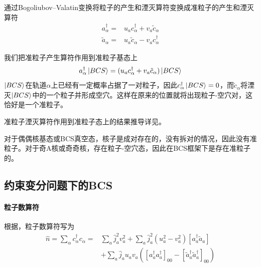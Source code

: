 通过Bogoliubov–Valatin变换\cite{Bogoliubov1958,Valatin1961May}将粒子的产生和湮灭算符变换成准粒子的产生和湮灭算符
\begin{equation}\begin{aligned}
    a^{\dagger}_{\alpha} =& u_{a} c^{\dagger}_{\alpha} + v_{a} \tilde{c}_{\alpha} \\
    \tilde{a}_{\alpha} =& u_{a} \tilde{c}_{\alpha} - v_{a} c^{\dagger}_{\alpha}
    \label{eq:qp-crt-hil}
\end{aligned}\end{equation}

\begin{note}
    我们把准粒子产生算符作用到准粒子基态上
    $$a^{\dagger}_{\alpha} \Ket{BCS} = (u_{a} c^{\dagger}_{\alpha} + v_{a} \tilde{c}_{\alpha}) \Ket{BCS}$$
    $\Ket{BCS}$在轨道$\alpha$上已经有一定概率占据了一对粒子，因此$c^{\dagger}_{\alpha}\Ket{BCS} = 0$，而$\tilde{c}_{\alpha}$将湮灭$\Ket{BCS}$中的一个粒子并形成空穴。这样在原来的位置就将出现粒子-空穴对，这恰好是一个准粒子。

    准粒子湮灭算符作用到准粒子态上的结果推导详见\citep[P. 182 脚注]{zengjy}。
\end{note}

对于偶偶核基态或BCS真空态，核子是成对存在的，没有拆对的情况，因此没有准粒子。对于奇A核或奇奇核，存在粒子-空穴态，因此在BCS框架下是存在准粒子的。


\subsection{约束变分问题下的BCS}

\paragraph*{粒子数算符}

根据\citep[Eq. 13.38]{suhonen-NtoN}，粒子数算符写为
\begin{equation*}\begin{aligned}
    \hat{n} = \sum_{\alpha}c^{\dagger}_{\alpha} c_{\alpha} =& \sum_{a} \hat{j}^2_{a} v_{a}^2 + \sum_{a} \hat{j}^2_{a} (u_{a}^2 - v_{a}^2) \left[a_{a}^{\dagger} \tilde{a}_a\right] \\
                                                            & + \sum_{a} \hat{j}_{a} u_{a} v_{a} \left([a_{a}^{\dagger} a_{a}^{\dagger}]_{00} - [\tilde{a}_{a}^{\dagger} \tilde{a}_{a}^{\dagger}]_{00}\right)
\end{aligned}\end{equation*}

